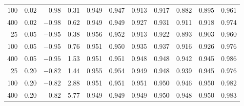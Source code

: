 \begin{tabular}{rrrrrrrrrrr}
100 & 0.02 & $-0.98$ & 0.31 & 0.949 & 0.947 & 0.913 & 0.917 & 0.882 & 0.895 & 0.961 \\
400 & 0.02 & $-0.98$ & 0.62 & 0.949 & 0.949 & 0.927 & 0.931 & 0.911 & 0.918 & 0.974 \\
25 & 0.05 & $-0.95$ & 0.38 & 0.956 & 0.952 & 0.913 & 0.922 & 0.893 & 0.903 & 0.960 \\
100 & 0.05 & $-0.95$ & 0.76 & 0.951 & 0.950 & 0.935 & 0.937 & 0.916 & 0.926 & 0.976 \\
400 & 0.05 & $-0.95$ & 1.53 & 0.951 & 0.951 & 0.948 & 0.948 & 0.942 & 0.945 & 0.986 \\
25 & 0.20 & $-0.82$ & 1.44 & 0.955 & 0.954 & 0.949 & 0.948 & 0.939 & 0.945 & 0.976 \\
100 & 0.20 & $-0.82$ & 2.88 & 0.951 & 0.951 & 0.951 & 0.950 & 0.946 & 0.950 & 0.982 \\
400 & 0.20 & $-0.82$ & 5.77 & 0.949 & 0.949 & 0.949 & 0.950 & 0.948 & 0.950 & 0.983 \\
\bottomrule
\end{tabular}
